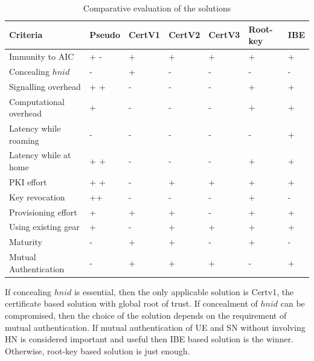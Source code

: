 \documentclass{llncs} %
\begin{document}
\begin{table}
\begin{center}
\caption{Comparative evaluation of the solutions}
\begin{tabular}{ |p{3.5cm}|P{1.25cm}|P{1.25cm}|P{1.25cm}|P{1.25cm}|P{1.5cm}| P{1cm} | }
\hline
\textbf{Criteria} & \textbf{Pseudo} & \textbf{CertV1} & \textbf{CertV2} & \textbf{CertV3} & \textbf{Root-key} & \textbf{IBE}\\
\hline \hline
Immunity to AIC & + - & + & + & + & + & + \\ \hline
Concealing $hnid$ & - & + & - & - & - & - \\ \hline
Signalling overhead & + + & - & - & - & + & + \\ \hline
Computational overhead & + & - & - & - & + & + \\ \hline
Latency while roaming & - & - & -  & - & - & + \\ \hline
Latency while at home & + + & - & -  & - & + & + \\ \hline
PKI effort & + + &  - & + & + & + & + \\ \hline
Key revocation & ++ & - & - & - & + & - \\ \hline
Provisioning effort & + & + & + & - & + & + \\ \hline
Using existing gear & + & - & + & + & + & + \\ \hline
Maturity  & - & + & + & - & + & - \\ \hline
Mutual Authentication & - & + & + & + & - & + \\ \hline
\end{tabular}
\label{table:comparison}
\end{center}
\vspace{-.8cm}
\end{table}
If concealing $hnid$ is essential, then the only applicable solution is Certv1, the certificate based solution with global root of trust. If concealment of $hnid$ can be compromised, then the choice  of the solution depends on the requirement of mutual authentication. If mutual authentication of UE and SN without involving HN is considered important and useful then IBE based solution is the winner. Otherwise, root-key based solution is just enough.
\end{document}
